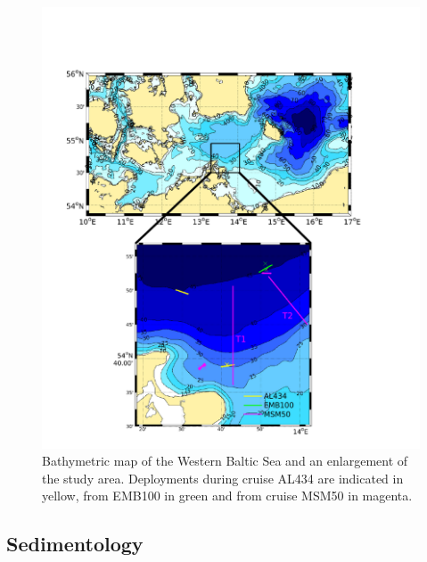  \begin{figure}[ht]
 \centering
\includegraphics[width=17cm]{bilder/studyarea.pdf}
 \caption{Bathymetric map of the Western Baltic Sea and an enlargement of the 
study area. Deployments during cruise AL434 are indicated in yellow, from 
EMB100 in green and from cruise MSM50 in magenta.}
 \label{studyarea}
 \end{figure}

 \FloatBarrier
\subsection{Sedimentology}

